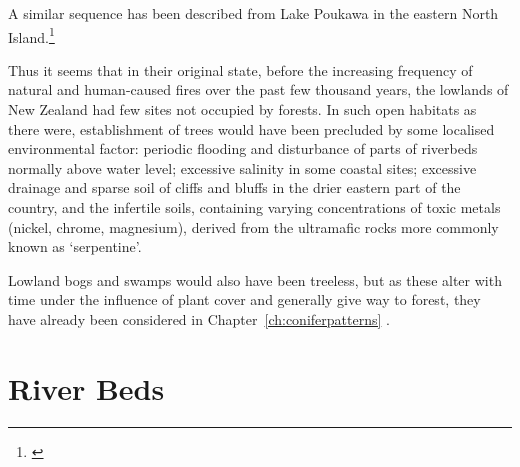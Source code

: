 A similar sequence has been described from Lake Poukawa in the eastern North Island.\footnote{\cite{mcglone1978forest}}

Thus it seems that in their original state, before the increasing frequency of natural and human-caused fires over the past few thousand years, the lowlands of New Zealand had few sites not occupied by forests.
In such open habitats as there were, establishment of trees would have been precluded by some localised environmental factor: periodic flooding and disturbance of parts of riverbeds normally above water level; excessive salinity in some coastal sites; excessive drainage and sparse soil of cliffs and bluffs in the drier eastern part of the country, and the infertile soils, containing varying concentrations of toxic metals (nickel, chrome, magnesium), derived from the ultramafic rocks more commonly known as `serpentine'.

Lowland bogs and swamps would also have been treeless, but as these alter with time under the influence of plant cover and generally give way to forest, they have already been considered in Chapter~\ref{ch:coniferpatterns} .

\section{River Beds}

